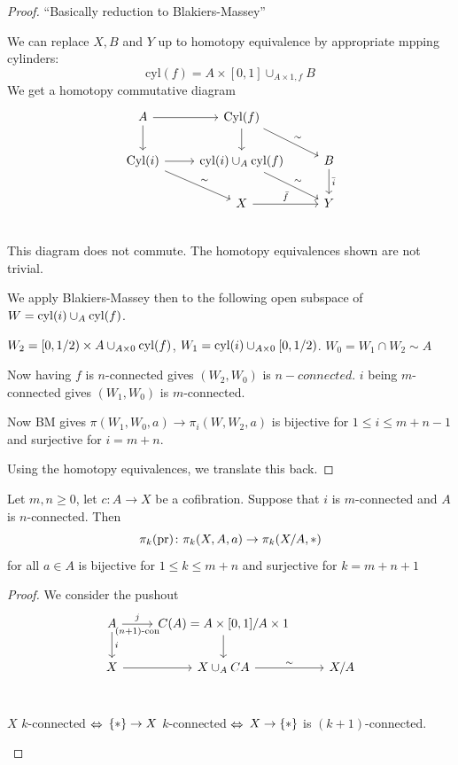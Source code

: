 \documentclass[language=english]{TemplateLecture}
\begin{document}
\begin{proof}
    \enquote{Basically reduction to Blakiers-Massey}

    We can replace \(X, B\) and \(Y\) up to homotopy equivalence by appropriate mpping cylinders:
    \[\mathrm{cyl}(f) = A\times [0,1]\cup_{A\times 1 , f} B\]
    We get a homotopy commutative diagram
    \[\begin{tikzcd}
        A \ar[r]\ar[d] & \mathrm{Cyl}(f) \ar[d]  \ar[rd, "\sim"]& \\
        \mathrm{Cyl}(i) \ar[r]\ar[rd, "\sim"] & \mathrm{cyl}(i) \cup_A \mathrm{cyl}(f)\ar[rd, "\sim"] & B\ar[d, "\bar i"] \\
        & X \ar[r, "\bar f"] & Y \\
    \end{tikzcd}\]
    This diagram does not commute. The homotopy equivalences shown are not trivial.

    We apply Blakiers-Massey then to the following open subspace of \(W = \mathrm{cyl}(i)\cup_A \mathrm{cyl}(f)\).

    \(W_2 = [0,1/2) \times A\cup_{A\times 0} \mathrm{cyl}(f)\), \(W_1 = \mathrm{cyl}(i) \cup_{A\times 0} [0, 1/2)\). \(W_0 = W_1\cap W_2 \sim A\)

    Now having \(f\) is \(n\)-connected gives \((W_2, W_0)\) is \(n-connected\). \(i\) being \(m\)-connected gives \((W_1, W_0)\) is \(m\)-connected.

    Now BM gives \(\pi(W_1, W_0, a)\to \pi_i(W, W_2, a)\) is bijective for \(1 \leq i \leq m+n-1\) and surjective for \(i = m+n\).

    Using the homotopy equivalences, we translate this back.
\end{proof}

\begin{proposition}[11.1 in Lücks]
    Let \(m,n \geq 0\), let \(c\colon A \to X \) be a cofibration. Suppose that \(i\) is \(m\)-connected and \(A\) is \(n\)-connected. Then 
    \[\pi_k(\operatorname{pr})\colon \pi_k(X,A,a) \to \pi_k(X/A, *)\]
    for all \(a \in A\) is bijective for \(1 \leq k \leq m+n\) and surjective for \(k = m+n+1\)
\end{proposition}

\begin{proof}
    We consider the pushout
    \[\begin{tikzcd}
        A \ar[d, "i"]\ar[r, "j", "(n+1)\text{-con}"'] & C(A) = A\times [0,1]/A\times 1 \ar[d] \\
        X \ar[r] & X \cup_A CA \ar[r, "\sim"] & X/A\\
    \end{tikzcd}\]

    \begin{remark}
        \(X\) \(k\)-connected \(\Leftrightarrow\) \(\{*\}\to X\) \(k\)-connected \(\Leftrightarrow\) \(X\to \{*\}\) is \((k+1)\)-connected.
    \end{remark}
\end{proof}
\end{document}
